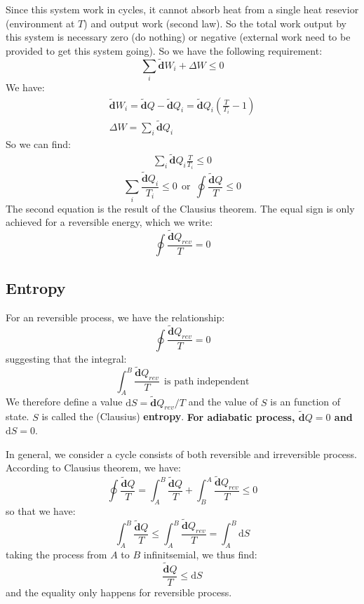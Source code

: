 \documentclass{article}
\newcommand{\dbar}{\mathbf{\tilde{d}}}
\newcommand{\dnor}{\text{d}}
\begin{document}
Since this system work in cycles, it cannot absorb heat from a single heat resevior (environment at $T$) 
and output work (second law). So the total work output by this system is necessary zero (do nothing) or negative 
(external work need to be provided to get this system going). So we have the following requirement:
\begin{equation}
    \sum_i \dbar W_i + \Delta W \le 0
\end{equation}
We have:
\begin{gather}
    \dbar W_i = \dbar Q - \dbar Q_i = \dbar Q_i (\frac{T}{T_i} - 1) \\
    \Delta W = \sum_i \dbar Q_i 
\end{gather}
So we can find:
\begin{gather}
    \sum_i \dbar Q_i \frac{T}{T_i} \le 0 
\end{gather}
\[
\boxed{\sum_i \frac{\dbar Q_i}{T_i} \le 0 \ \ \text{or}\ \  \oint \frac{\dbar Q}{T} \le 0}
\]
The second equation is the result of the Clausius theorem. The equal sign is only achieved for a reversible energy,
which we write:
\[
   \boxed{ \oint \frac{\dbar Q_{rev}}{T} = 0 }
\]

\subsection{Entropy}
For an reversible process, we have the relationship:
\begin{equation}
    \oint \frac{\dbar Q_{rev}}{T} = 0
\end{equation}
suggesting that the integral:
\begin{equation}
    \int_{A}^{B} \frac{\dbar Q_{rev}}{T} \ \ \text{is path independent}
\end{equation}
We therefore define a value $\dnor S = \dbar Q_{rev} / T$ and the value 
of $S$ is an function of state. $S$ is called the (Clausius) \textbf{entropy}. 
\textbf{For adiabatic process, $\dbar Q = 0$ and $\dnor S = 0$}.

In general, we consider a cycle consists of both reversible and 
irreversible process. According to Clausius theorem, we have:
\begin{equation}
    \oint \frac{\dbar Q}{T} = \int_A^B \frac{\dbar Q}{T} + \int_B^A \frac{\dbar Q_{rev}}{T} \le 0
\end{equation}
so that we have:
\begin{equation}
    \int_A^B \frac{\dbar Q}{T} \le \int_A^B \frac{\dbar Q_{rev}}{T} = \int_A^B \dnor S  \label{entropy_increase}
\end{equation}
taking the process from $A$ to $B$ infinitsemial, we thus find:
\begin{equation}
    \frac{\dbar Q}{T} \le \dnor S
\end{equation}
and the equality only happens for reversible process.
\end{document}
